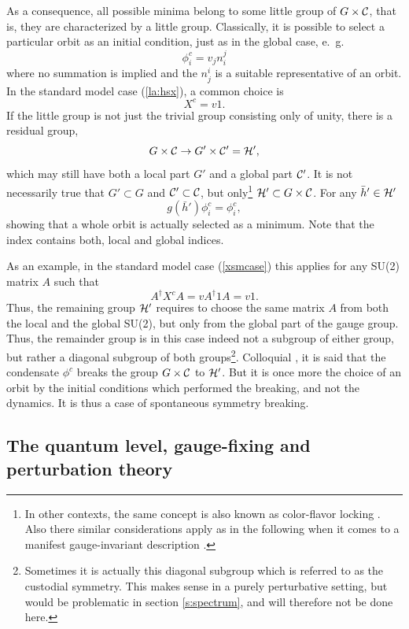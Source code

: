 \documentclass[final,12pt]{article}
\newcommand*{\no}{\noindent}
\newcommand*{\be}{\begin{equation}}
\newcommand*{\ee}{\end{equation}}
\newcommand*{\pref}[1]{(\ref{#1})}
\newcommand*{\nn}{\nonumber}
\newcommand*{\1}{1\!\!\!\bot}
\begin{document}
As a consequence, all possible minima belong to some little group of $G\times{\cal C}$, that is, they are characterized by a little group. Classically, it is possible to select a particular orbit as an initial condition, just as in the global case, e.\ g.\
\be
\phi_i^c=v_jn_i^j\nn
\ee
\no where no summation is implied and the $n^i_j$ is a suitable representative of an orbit. In the standard model case \pref{la:hsx}, a common choice is
\be
X^c=v1\label{xsmcase}.
\ee
\no If the little group is not just the trivial group consisting only of unity, there is a residual group,
\be
G\times{\cal C}\to G'\times{\cal C'}={\cal H}'\nn,
\ee
\no which may still have both a local part $G'$ and a global part ${\cal C}'$. It is not necessarily true that $G'\subset G$ and ${\cal C}'\subset{\cal C}$, but only\footnote{In other contexts, the same concept is also known as color-flavor locking \cite{Buballa:2003qv,Maas:2012ct}. Also there similar considerations apply as in the following when it comes to a manifest gauge-invariant description \cite{Maas:2012ct,Schafer:1998ef,Alford:1999pa}.} ${\cal H}'\subset G \times{\cal C}$. For any $\bar{h}'\in{\cal H}'$
\be
g(\bar{h}')\phi_i^c=\phi_i^c\nn,
\ee
\no showing that a whole orbit is actually selected as a minimum. Note that the index contains both, local and global indices.

As an example, in the standard model case \pref{xsmcase} this applies for any SU(2) matrix $A$ such that
\be
A^\dagger X^c A=v A^\dagger 1 A=v 1\label{colfmix}.
\ee
\no Thus, the remaining group ${\cal H}'$ requires to choose the same matrix $A$ from both the local and the global SU(2), but only from the global part of the gauge group. Thus, the remainder group is in this case indeed not a subgroup of either group, but rather a diagonal subgroup of both groups\footnote{Sometimes it is actually this diagonal subgroup which is referred to as the custodial symmetry. This makes sense in a purely perturbative setting, but would be problematic in section \ref{s:spectrum}, and will therefore not be done here.}. Colloquial \cite{Bohm:2001yx}, it is said that the condensate $\phi^c$ breaks the group $G\times{\cal C}$ to ${\cal H}'$. But it is once more the choice of an orbit by the initial conditions which performed the breaking, and not the dynamics. It is thus a case of spontaneous symmetry breaking.

\subsection{The quantum level, gauge-fixing and perturbation theory}\label{ss:qulev}
\end{document}

